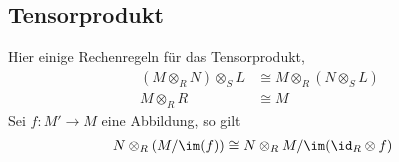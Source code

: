 \subsection{Tensorprodukt}
\begin{comment}
\begin{defn}[Tensorprodukt]
\cite[3(Algebra).11.21]{stacks-project}
\begin{center}
\begin{tikzpicture} [scale=3.3, descr/.style={fill=white,inner sep=2.5pt} ]
  \matrix (m) [
    matrix of math nodes
    , row sep=2em
    , column sep=3em
  ]{
    M\times N & M\otimes_RN \\
              & T \\
  };
  \path[->,font=\scriptsize,>=angle 90]
  (m-1-1) edge node[above]{$  $} (m-1-2)
  (m-1-1) edge node[below]{$f$} (m-2-2)
  ;
  \path[->,font=\scriptsize,>=angle 90,dashed]
  (m-1-2) edge node[right]{$\exists!\gamma$} (m-2-2)
  ;
\end{tikzpicture}
\end{center}
Für eine Abbildung $f:M\rightarrow M'$ definiere das Tensorprodukt davon über
$R$ mit $N$ als
\[
\id_N \otimes f:
\begin{array}[t]{ccc}
N\otimes_{R}M & \rightarrow & N\otimes_{R}M'\\
n\otimes m & \mapsto & n\otimes f(m)
\end{array}
\]
\end{defn}
\end{comment}
\begin{bem} \label{bem:Rechenregeln-Tensorprodukt}
Hier einige Rechenregeln für das Tensorprodukt,
\begin{align}
(M\otimes_R N)\otimes_S L &\cong M\otimes_R (N \otimes_S L)
  \label{bem:Rechenregeln-Tensorprodukt1}\\
M\otimes_R R &\cong M \label{bem:Rechenregeln-Tensorprodukt2}
\end{align}
Sei $f:M'\rightarrow M$ eine Abbildung, so gilt
\begin{align}
N\otimes_R(M/\im(f)) &\cong N\otimes_R M / \im(\id_{R}\otimes f)
\label{bem:Rechenregeln-Tensorprodukt3}
\end{align}
\end{bem}

